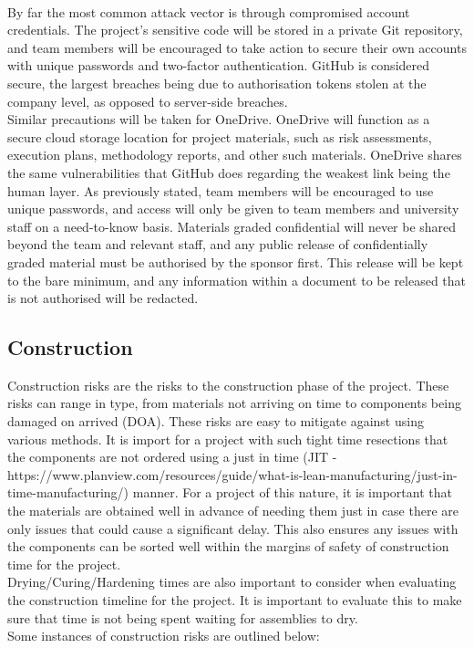 \documentclass [12pt]{article}
\begin{document}
\\
By far the most common attack vector is through compromised account credentials. The project’s sensitive code will be stored in a private Git repository, and team members will be encouraged to take action to secure their own accounts with unique passwords and two-factor authentication. GitHub is considered secure, the largest breaches being due to authorisation tokens stolen at the company level, as opposed to server-side breaches.
\\
Similar precautions will be taken for OneDrive. OneDrive will function as a secure cloud storage location for project materials, such as risk assessments, execution plans, methodology reports, and other such materials. OneDrive shares the same vulnerabilities that GitHub does regarding the weakest link being the human layer. As previously stated, team members will be encouraged to use unique passwords, and access will only be given to team members and university staff on a need-to-know basis.
Materials graded confidential will never be shared beyond the team and relevant staff, and any public release of confidentially graded material must be authorised by the sponsor first. This release will be kept to the bare minimum, and any information within a document to be released that is not authorised will be redacted.

\subsection{Construction}\label{sec:Construction_Risk}

Construction risks are the risks to the construction phase of the project. These risks can range in type, from materials not arriving on time to components being damaged on arrived (DOA). These risks are easy to mitigate against using various methods. It is import for a project with such tight time resections that the components are not ordered using a just in time (JIT - https://www.planview.com/resources/guide/what-is-lean-manufacturing/just-in-time-manufacturing/) manner. For a project of this nature, it is important that the materials are obtained well in advance of needing them just in case there are only issues that could cause a significant delay. This also ensures any issues with the components can be sorted well within the margins of safety of construction time for the project.
\\
Drying/Curing/Hardening times are also important to consider when evaluating the construction timeline for the project. It is important to evaluate this to make sure that time is not being spent waiting for assemblies to dry.
\\
Some instances of construction risks are outlined below:
\end{document}
